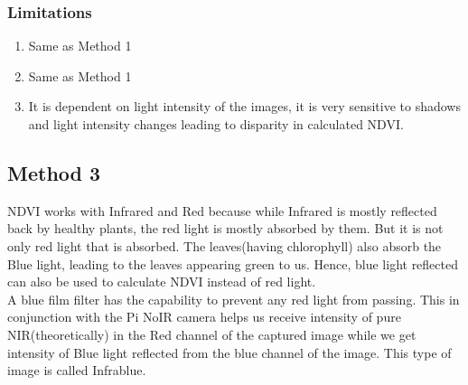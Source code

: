 \subsubsection{Limitations}
\begin{enumerate}
    \item Same as Method 1
    \item Same as Method 1
    \item It is dependent on light intensity of the images, it is very sensitive to shadows and light intensity changes leading to disparity in calculated NDVI. 
\end{enumerate}
\subsection{Method 3}
NDVI works with Infrared and Red because while Infrared is mostly reflected back by healthy plants, the red light is mostly absorbed by them. But it is not only red light that is absorbed. The leaves(having chlorophyll) also absorb the Blue light, leading to the leaves appearing green to us. Hence, blue light reflected can also be used to calculate NDVI instead of red light.
\\
A blue film filter has the capability to prevent any red light from passing. This in conjunction with the Pi NoIR camera helps us receive intensity of pure NIR(theoretically) in the Red channel of the captured image while we get intensity of Blue light reflected from the blue channel of the image. This type of image is called Infrablue.

